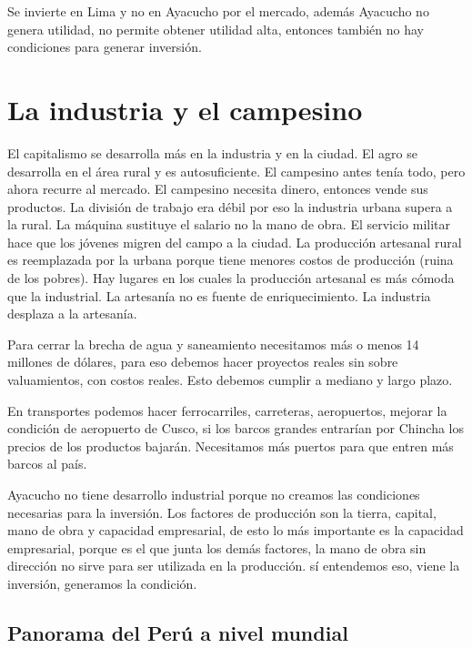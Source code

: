 \documentclass[
  a4paper,
]{article}
\begin{document}
Se invierte en Lima y no en Ayacucho por el mercado, además Ayacucho no
genera utilidad, no permite obtener utilidad alta, entonces también no
hay condiciones para generar inversión.

\hypertarget{la-industria-y-el-campesino}{%
\section{La industria y el
campesino}\label{la-industria-y-el-campesino}}

El capitalismo se desarrolla más en la industria y en la ciudad. El agro
se desarrolla en el área rural y es autosuficiente. El campesino antes
tenía todo, pero ahora recurre al mercado. El campesino necesita dinero,
entonces vende sus productos. La división de trabajo era débil por eso
la industria urbana supera a la rural. La máquina sustituye el salario
no la mano de obra. El servicio militar hace que los jóvenes migren del
campo a la ciudad. La producción artesanal rural es reemplazada por la
urbana porque tiene menores costos de producción (ruina de los pobres).
Hay lugares en los cuales la producción artesanal es más cómoda que la
industrial. La artesanía no es fuente de enriquecimiento. La industria
desplaza a la artesanía.

Para cerrar la brecha de agua y saneamiento necesitamos más o menos 14
millones de dólares, para eso debemos hacer proyectos reales sin sobre
valuamientos, con costos reales. Esto debemos cumplir a mediano y largo
plazo.

En transportes podemos hacer ferrocarriles, carreteras, aeropuertos,
mejorar la condición de aeropuerto de Cusco, si los barcos grandes
entrarían por Chincha los precios de los productos bajarán. Necesitamos
más puertos para que entren más barcos al país.

Ayacucho no tiene desarrollo industrial porque no creamos las
condiciones necesarias para la inversión. Los factores de producción son
la tierra, capital, mano de obra y capacidad empresarial, de esto lo más
importante es la capacidad empresarial, porque es el que junta los demás
factores, la mano de obra sin dirección no sirve para ser utilizada en
la producción. sí entendemos eso, viene la inversión, generamos la
condición.

\hypertarget{panorama-del-peruxfa-a-nivel-mundial}{%
\subsection{Panorama del Perú a nivel
mundial}\label{panorama-del-peruxfa-a-nivel-mundial}}
\end{document}
